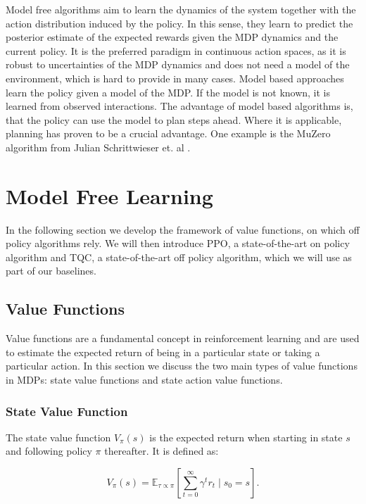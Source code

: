 Model free algorithms aim to learn the dynamics of the system together with the action distribution induced by the policy. In this sense, they learn to predict the posterior 
estimate of the expected rewards given the MDP dynamics and the current policy. It is the preferred paradigm in continuous action spaces, 
as it is robust to uncertainties of the MDP dynamics and does not need a model of the environment, which is hard to provide in many cases. 
Model based approaches learn the policy given a model of the MDP. If the model is not known, it is learned 
from observed interactions. The advantage of model based algorithms is, that the policy can use the model to plan steps ahead. 
Where it is applicable, planning has proven to be 
a crucial advantage. One example is the MuZero algorithm from Julian Schrittwieser et. al \cite{MUZero}.

\section{Model Free Learning}
\label{sec:mod_free_ref}
In the following section we develop the framework of value functions, on which off policy algorithms rely. 
We will then introduce PPO, a state-of-the-art on policy algorithm and TQC, a state-of-the-art off policy algorithm, 
which we will use as part of our baselines.

\subsection{Value Functions}

Value functions are a fundamental concept in reinforcement learning and are used to estimate the expected return of being in a 
particular state or taking a particular action. In this section we discuss the two main types of value functions in MDPs: state 
value functions and state action value functions.

\subsubsection{State Value Function}

The state value function $V_{\pi}(s)$ is the expected return when starting in state $s$ and following policy $\pi$ thereafter. It is defined as:

\begin{equation}
    \label{eq:value_func_proper}
    V_{\pi}(s) = \mathbb{E}_{\tau \propto \pi}\left[\sum_{t=0}^{\infty} \gamma^t r_t \mid s_0 = s\right].
\end{equation}

